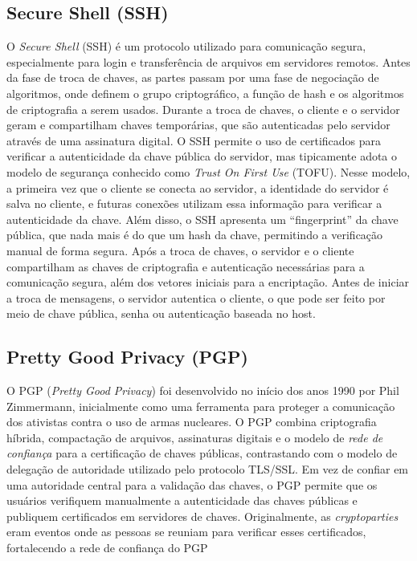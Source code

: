 \subsection{Secure Shell (SSH)}

O {\em Secure Shell} (SSH) é um protocolo utilizado para comunicação segura, especialmente para login e transferência de arquivos em servidores remotos.
Antes da fase de troca de chaves, as partes passam por uma fase de negociação de algoritmos, onde definem o grupo criptográfico, a função de hash e os algoritmos de criptografia a serem usados.
Durante a troca de chaves, o cliente e o servidor geram e compartilham chaves temporárias, que são autenticadas pelo servidor através de uma assinatura digital.
O SSH permite o uso de certificados para verificar a autenticidade da chave pública do servidor, mas tipicamente adota o modelo de segurança conhecido como {\em Trust On First Use} (TOFU).
Nesse modelo, a primeira vez que o cliente se conecta ao servidor, a identidade do servidor é salva no cliente, e futuras conexões utilizam essa informação para verificar a autenticidade da chave.
Além disso, o SSH apresenta um ``fingerprint'' da chave pública, que nada mais é do que um hash da chave, permitindo a verificação manual de forma segura.
Após a troca de chaves, o servidor e o cliente compartilham as chaves de criptografia e autenticação necessárias para a comunicação segura, além dos vetores iniciais para a encriptação.
Antes de iniciar a troca de mensagens, o servidor autentica o cliente, o que pode ser feito por meio de chave pública, senha ou autenticação baseada no host.

\subsection{Pretty Good Privacy (PGP)}

O PGP ({\em Pretty Good Privacy}) foi desenvolvido no início dos anos 1990 por Phil Zimmermann, inicialmente como uma ferramenta para proteger a comunicação dos ativistas contra o uso de armas nucleares.
O PGP combina criptografia híbrida, compactação de arquivos, assinaturas digitais e o modelo de {\em rede de confiança} para a certificação de chaves públicas, contrastando com o modelo de delegação de autoridade utilizado pelo protocolo TLS/SSL.
Em vez de confiar em uma autoridade central para a validação das chaves, o PGP permite que os usuários verifiquem manualmente a autenticidade das chaves públicas e publiquem certificados em servidores de chaves.
Originalmente, as {\em cryptoparties} eram eventos onde as pessoas se reuniam para verificar esses certificados, fortalecendo a rede de confiança do PGP

